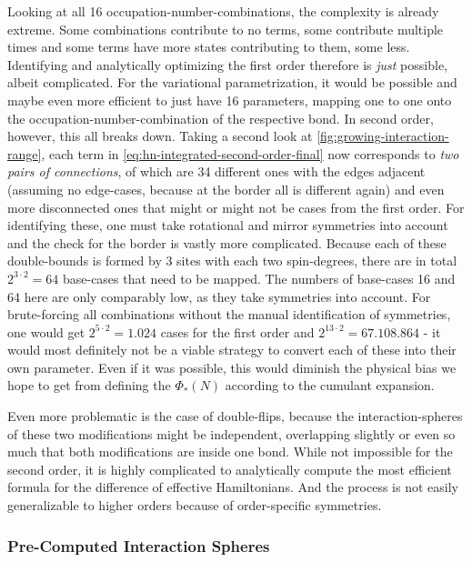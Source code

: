 Looking at all 16 occupation-number-combinations, the complexity is already extreme. 
Some combinations contribute to no terms, some contribute multiple times and some terms have more states contributing to them, some less.
Identifying and analytically optimizing the first order therefore is \emph{just} possible, albeit complicated.
For the variational parametrization, it would be possible and maybe even more efficient to just have 16 parameters, mapping one to one onto the occupation-number-combination of the respective bond. 
In second order, however, this all breaks down.
Taking a second look at \autoref{fig:growing-interaction-range}, each term in \autoref{eq:hn-integrated-second-order-final} now corresponds to \emph{two pairs of connections}, of which are 34 different ones with the edges adjacent (assuming no edge-cases, because at the border all is different again) and even more disconnected ones that might or might not be cases from the first order.
For identifying these, one must take rotational and mirror symmetries into account and the check for the border is vastly more complicated.
Because each of these double-bounds is formed by 3 sites with each two spin-degrees, there are in total $2^{3\cdot 2} = 64$ base-cases that need to be mapped.
The numbers of base-cases 16 and 64 here are only comparably low, as they take symmetries into account. 
For brute-forcing all combinations without the manual identification of symmetries, one would get $2^{5\cdot 2} = 1.024$ cases for the first order and $2^{13\cdot 2} = 67.108.864$ - it would most definitely not be a viable strategy to convert each of these into their own parameter.
Even if it was possible, this would diminish the physical bias we hope to get from defining the $\Phi_\ast(N)$ according to the cumulant expansion.

Even more problematic is the case of double-flips, because the interaction-spheres of these two modifications might be independent, overlapping slightly or even so much that both modifications are inside one bond.
While not impossible for the second order, it is highly complicated to analytically compute the most efficient formula for the difference of effective Hamiltonians.
And the process is not easily generalizable to higher orders because of order-specific symmetries.


\subsubsection*{Pre-Computed Interaction Spheres}

